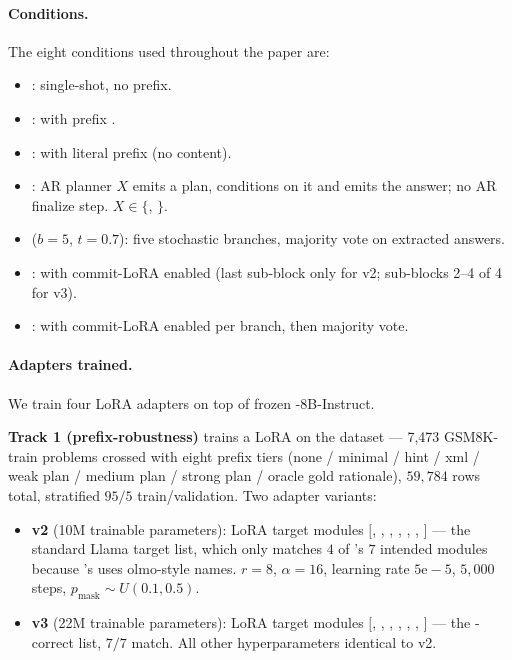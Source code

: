 \paragraph{Conditions.}
The eight conditions used throughout the paper are:

\begin{itemize}
    \item \ctwo{}: \LLaDA{} single-shot, no prefix.
    \item {}: \LLaDA{} with prefix
          .
    \item {}: \LLaDA{} with literal prefix
           (no content).
    \item \cthree{}: AR planner $X$ emits a plan, \LLaDA{}
          conditions on it and emits the answer; no AR finalize step.
          $X \in \{$, $\}$.
    \item {} ($b{=}5$, $t{=}0.7$): five stochastic \LLaDA{}
          branches, majority vote on extracted answers.
    \item \ctwoc{}: \ctwo{} with commit-LoRA enabled (last sub-block
          only for v2; sub-blocks 2--4 of 4 for v3).
    \item \cmajc{}:  with commit-LoRA enabled per
          branch, then majority vote.
\end{itemize}

\paragraph{Adapters trained.}
We train four LoRA adapters on top of frozen \LLaDA{}-8B-Instruct.

\textbf{Track 1 (prefix-robustness)} trains a LoRA on the
 dataset --- 7,473
GSM8K-train problems crossed with eight prefix tiers (none /
minimal / hint / xml / weak  plan / medium 
plan / strong  plan / oracle gold rationale), $59{,}784$
rows total, stratified $95/5$ train/validation.  Two adapter
variants:

\begin{itemize}
    \item \textbf{v2} (10M trainable parameters): LoRA target
          modules $[$, , ,
          , , ,
          $]$ --- the standard Llama target list,
          which only matches $4$ of \LLaDA{}'s $7$ intended modules
          because \LLaDA{}'s  uses olmo-style
          names.  $r{=}8$, $\alpha{=}16$, learning rate $5\mathrm{e}{-}5$,
          $5{,}000$ steps, $p_\text{mask} \sim U(0.1, 0.5)$.
    \item \textbf{v3} (22M trainable parameters): LoRA target
          modules $[$, , ,
          , , ,
          $]$ --- the \LLaDA{}-correct list, $7/7$
          match.  All other hyperparameters identical to v2.
\end{itemize}


